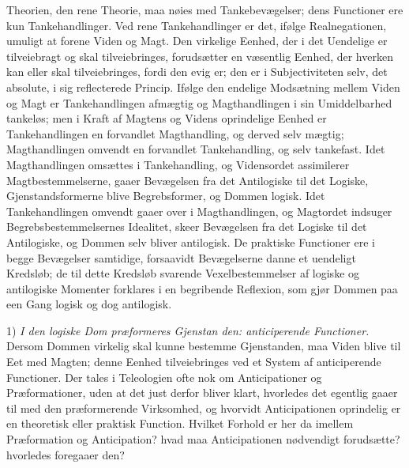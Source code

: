 \documentclass[12pt]{book}
\newcommand{\opage}[1]{\marginnote{\footnotesize\textit{[#1]}}}
\begin{document}
Theorien, den rene Theorie, maa nøies med Tankebevægelser;
dens Functioner ere kun Tankehandlinger. Ved rene
Tankehandlinger er det, ifølge Realnegationen, umuligt at
forene Viden og Magt. Den virkelige Eenhed, der i det
Uendelige er tilveiebragt og skal tilveiebringes, forudsætter en
væsentlig Eenhed, der hverken kan eller skal tilveiebringes,
fordi den evig er; den er i Subjectiviteten selv, det absolute,
i sig reflecterede Princip. Ifølge den endelige Modsætning
mellem Viden og Magt er Tankehandlingen afmægtig og
Magthandlingen i sin Umiddelbarhed tankeløs; men i Kraft
af Magtens og Videns oprindelige Eenhed er Tankehandlingen
en forvandlet Magthandling, og derved selv mægtig; Magthandlingen
omvendt en forvandlet Tankehandling, og selv
tankefast. Idet Magthandlingen omsættes i Tankehandling,
og Vidensordet assimilerer Magtbestemmelserne, gaaer Bevægelsen
fra det Antilogiske til det Logiske, Gjenstandsformerne
blive Begrebsformer, og Dommen logisk. Idet Tankehandlingen
omvendt gaaer over i Magthandlingen, og Magtordet
indsuger Begrebsbestemmelsernes Idealitet, skeer Bevægelsen
fra det Logiske til det Antilogiske, og Dommen selv bliver
antilogisk. De praktiske Functioner ere i begge Bevægelser
samtidige, forsaavidt Bevægelserne danne et uendeligt Kredsløb;
de til dette Kredsløb svarende Vexelbestemmelser af logiske
og antilogiske Momenter forklares i en begribende Reflexion,
som gjør Dommen paa een Gang logisk og dog
antilogisk.

1) \emph{I den logiske Dom præformeres Gjenstan%
\opage{122}den: anticiperende Functioner.} Dersom Dommen
virkelig skal kunne bestemme Gjenstanden, maa Viden blive
til Eet med Magten; denne Eenhed tilveiebringes ved et
System af anticiperende Functioner. Der tales i Teleologien
ofte nok om Anticipationer og Præformationer, uden at det
just derfor bliver klart, hvorledes det egentlig gaaer til med
den præformerende Virksomhed, og hvorvidt Anticipationen
oprindelig er en theoretisk eller praktisk Function. Hvilket
Forhold er her da imellem Præformation og Anticipation?
hvad maa Anticipationen nødvendigt forudsætte? hvorledes
foregaaer den?
\end{document}
